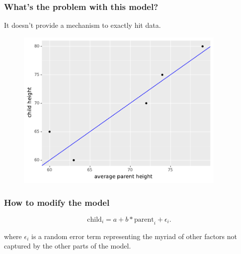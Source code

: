 \documentclass[handout]{beamer}
\begin{document}
\begin{frame}
	\frametitle{What's the problem with this model?}
	
	It doesn't provide a mechanism to exactly hit data.
	
	\begin{figure}[ht]
		\centerline{\includegraphics[width=0.9\textwidth]{../figures/galton_model_without_residuals.pdf}}
	\end{figure}
	
\end{frame}

\begin{frame}
	\frametitle{How to modify the model}
	
	\begin{equation}
	\text{child}_i = a + b * \text{parent}_i + \epsilon_i.
	\end{equation}
	
	where $\epsilon_i$ is a random error term representing the myriad of other factors not captured by the other parts of the model.
	
\end{frame}
\end{document}
